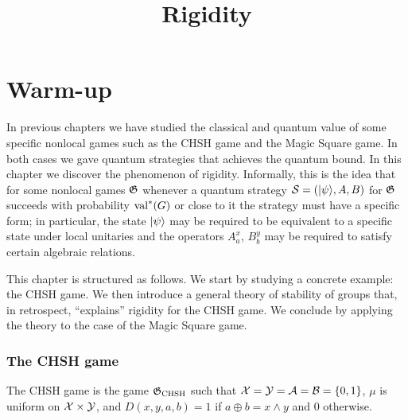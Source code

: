 



\part{Warm-up}
\label{book-part-warmup}

\title{Rigidity}
\label{rigidity}

\maketitle

\label{section-phantom}

\tableofcontents

In previous chapters we have studied the classical and quantum value of some specific nonlocal games such as the CHSH game and the Magic Square game. In both cases we gave quantum strategies that achieves the quantum bound. In this chapter we discover the phenomenon of rigidity. Informally, this is the idea that for some nonlocal games $\mathfrak{G}$ whenever a quantum strategy $\mathcal{S} = (|\psi\rangle,A,B)$ for $\mathfrak{G}$ succeeds with probability $\mathrm{val}^*(G)$ or close to it the strategy must have a specific form; in particular, the state $|\psi\rangle$ may be required to be equivalent to a specific state under local unitaries and the operators $A^x_a$, $B^y_b$ may be required to satisfy certain algebraic relations. 

This chapter is structured as follows. We start by studying a concrete example: the CHSH game. We then introduce a general theory of stability of groups that, in retrospect, ``explains'' rigidity for the CHSH game. We conclude by applying the theory to the case of the Magic Square game. 




\section{The CHSH game}
\label{section-chsh}


\begin{definition}
\label{definition-chsh}
The CHSH game is the game $\mathfrak{G}_{\mathrm{CHSH}}$ such that $\mathcal{X} = \mathcal{Y} = \mathcal{A} = \mathcal{B} = \{0,1\}$, $\mu$ is uniform on $\mathcal{X} \times \mathcal{Y}$, and $D(x,y,a,b) = 1$ if $a\oplus b = x\wedge y$ and $0$ otherwise. 
\end{definition}

